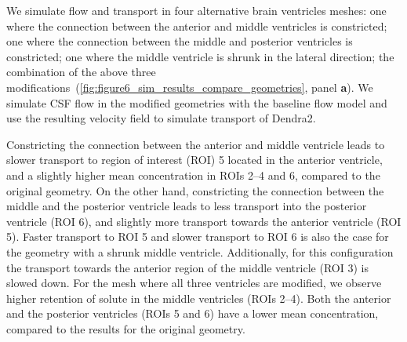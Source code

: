 \documentclass[fleqn]{wlscirep}
\begin{document}
We simulate flow and transport in four alternative brain ventricles meshes: one where the connection between the anterior and middle ventricles is constricted; one where the connection between the middle and posterior ventricles is constricted; one where the middle ventricle is shrunk in the lateral direction; the combination of the above three modifications~(\cref{fig:figure6_sim_results_compare_geometries}, panel \textbf{a}). We simulate CSF flow in the modified geometries with the baseline flow model and use the resulting velocity field to simulate transport of Dendra2.

Constricting the connection between the anterior and middle ventricle leads to slower transport to region of interest (ROI) 5 located in the anterior ventricle, and a slightly higher mean concentration in ROIs 2--4 and 6, compared to the original geometry. On the other hand, constricting the connection between the middle and the posterior ventricle leads to less transport into the posterior ventricle (ROI 6), and slightly more transport towards the anterior ventricle (ROI 5). Faster transport to ROI 5 and slower transport to ROI 6 is also the case for the geometry with a shrunk middle ventricle. Additionally, for this configuration the transport towards the anterior region of the middle ventricle (ROI 3) is slowed down. For the mesh where all three ventricles are modified, we observe higher retention of solute in the middle ventricles (ROIs 2--4). Both the anterior and the posterior ventricles (ROIs 5 and 6) have a lower mean concentration, compared to the results for the original geometry.
\end{document}
